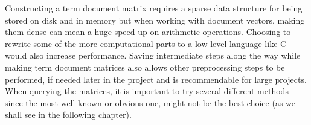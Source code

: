 Constructing a term document matrix requires a sparse data structure
for being stored on disk and in memory but when working with document
vectors, making them dense can mean a huge speed up on arithmetic
operations. Choosing to rewrite some of the more computational parts
to a low level language like C would also increase performance. Saving
intermediate steps along the way while making term document matrices
also allows other preprocessing steps to be performed, if needed later
in the project and is recommendable for large projects.\\

When querying the matrices, it is important to try several different
methods since the most well known or obvious one, might not be the
best choice (as we shall see in the following chapter).
